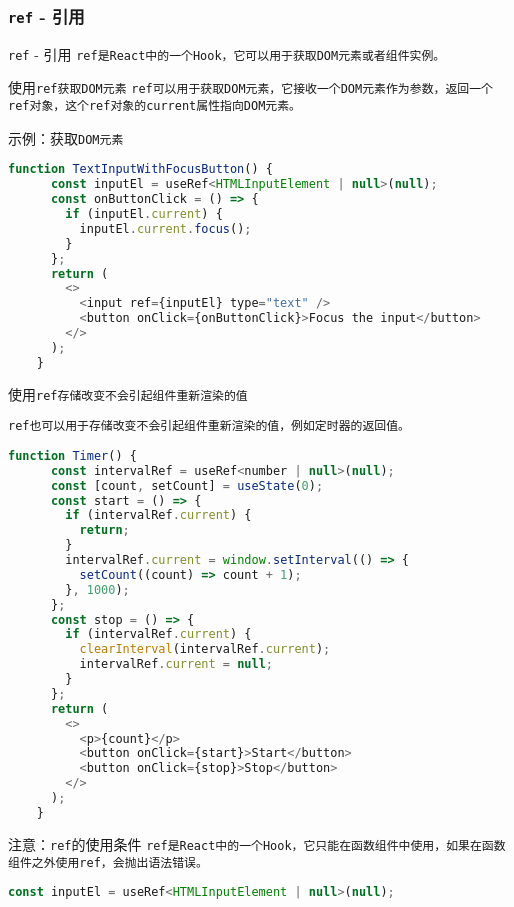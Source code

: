\documentclass{beamer}
\begin{document}
\begin{frame}
  \frametitle{\texttt{ref} - 引用}

  \begin{block}{\texttt{ref} - 引用}
    \tt{ref}是\tt{React}中的一个\tt{Hook}，它可以用于获取\tt{DOM}元素或者组件实例。
  \end{block}

  \begin{block}{使用\tt{ref}获取\tt{DOM}元素}
    \tt{ref}可以用于获取\tt{DOM}元素，它接收一个\tt{DOM}元素作为参数，返回一个\tt{ref}对象，这个\tt{ref}对象的\tt{current}属性指向\tt{DOM}元素。
  \end{block}

  \framebreak

  示例：获取\tt{DOM}元素

  \begin{lstlisting}[language=JavaScript]
    function TextInputWithFocusButton() {
      const inputEl = useRef<HTMLInputElement | null>(null);
      const onButtonClick = () => {
        if (inputEl.current) {
          inputEl.current.focus();
        }
      };
      return (
        <>
          <input ref={inputEl} type="text" />
          <button onClick={onButtonClick}>Focus the input</button>
        </>
      );
    }
\end{lstlisting}

  \framebreak

  \begin{block}{使用\tt{ref}存储改变不会引起组件重新渲染的值}

    \tt{ref}也可以用于存储改变不会引起组件重新渲染的值，例如定时器的返回值。
  \end{block}


  \begin{lstlisting}[language=JavaScript]
    function Timer() {
      const intervalRef = useRef<number | null>(null);
      const [count, setCount] = useState(0);
      const start = () => {
        if (intervalRef.current) {
          return;
        }
        intervalRef.current = window.setInterval(() => {
          setCount((count) => count + 1);
        }, 1000);
      };
      const stop = () => {
        if (intervalRef.current) {
          clearInterval(intervalRef.current);
          intervalRef.current = null;
        }
      };
      return (
        <>
          <p>{count}</p>
          <button onClick={start}>Start</button>
          <button onClick={stop}>Stop</button>
        </>
      );
    }
\end{lstlisting}

  \framebreak

  \begin{alertblock}{注意：\texttt{ref}的使用条件}
    \tt{ref}是\tt{React}中的一个\tt{Hook}，它只能在函数组件中使用，如果在函数组件之外使用\tt{ref}，会抛出语法错误。
  \end{alertblock}

  \begin{lstlisting}[language=JavaScript]
    const inputEl = useRef<HTMLInputElement | null>(null);
\end{lstlisting}

\end{frame}
\end{document}

